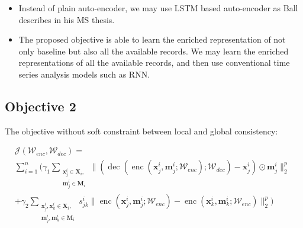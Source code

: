 \documentclass[letterpaper]{article} %
\begin{document}
\begin{itemize}
\item Instead of plain auto-encoder, we may use LSTM based auto-encoder as Ball describes in his MS thesis.
\item The proposed objective is able to learn the enriched representation of not only baseline but also all the available records. We may learn the enriched representations of all the available records, and then use conventional time series analysis models such as RNN.
\end{itemize}

\subsection{Objective 2}
The objective without soft constraint between local and global consistency:

\begin{math}
    \begin{aligned}
    &\mathcal{J}(\mathcal{W}_{enc}, \mathcal{W}_{dec})=\\
    &\sum_{i=1}^n(\gamma_1 \sum\limits_{\substack{\mathbf{x}_j^i \in \mathbf{X}_i,\\\mathbf{m}_j^i \in \mathbf{M}_i}}\| (\operatorname{dec}(\operatorname{enc}(\mathbf{x}^i_j, \mathbf{m}^i_j; \mathcal{W}_{enc}); \mathcal{W}_{dec}) - \mathbf{x}^i_j)\odot \mathbf{m}^i_j \|_2^p\\ 
    &+ \gamma_2 \sum\limits_{\substack{\mathbf{x}^i_j, \mathbf{x}^i_k \in \mathbf{X}_i, \\ \mathbf{m}^i_j, \mathbf{m}^i_k \in \mathbf{M}_i}} s^i_{jk} \| \operatorname{enc}(\mathbf{x}^i_j, \mathbf{m}^i_j; \mathcal{W}_{enc}) - \operatorname{enc}(\mathbf{x}^i_k, \mathbf{m}^i_k; \mathcal{W}_{enc})\|_2^p )
    \end{aligned}
\end{math}




\end{document}
